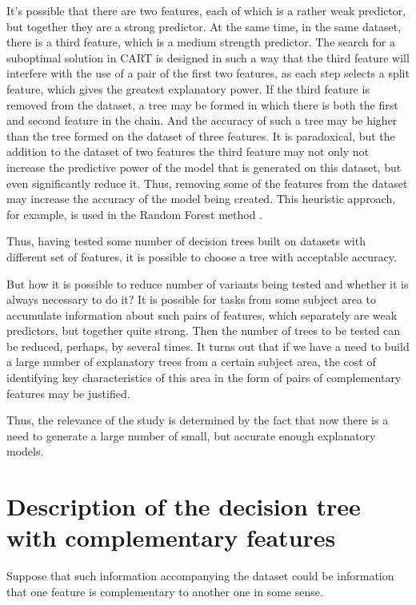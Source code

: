 \documentclass[conference]{IEEEtran}
\theoremstyle{definition}
\begin{document}
It's possible that there are two features, each of which is a rather weak predictor, but together they are a strong predictor. At the same time, in the same dataset, there is a third feature, which is a medium strength predictor. The search for a suboptimal solution in CART is designed in such a way that the third feature will interfere with the use of a pair of the first two features, as each step selects a split feature, which gives the greatest explanatory power. If the third feature is removed from the dataset, a tree may be formed in which there is both the first and second feature in the chain. And the accuracy of such a tree may be higher than the tree formed on the dataset of three features. It is paradoxical, but the addition to the dataset of two features the third feature may not only not increase the predictive power of the model that is generated on this dataset, but even significantly reduce it. Thus, removing some of the features from the dataset may increase the accuracy of the model being created. This heuristic approach, for example, is used in the Random Forest method \cite{RF}.


Thus, having tested some number of decision trees built on datasets with different set of features, it is possible to choose a tree with acceptable accuracy.


But how it is possible to reduce number of variants being tested and whether it is always necessary to do it? It is possible for tasks from some subject area to accumulate information about such pairs of features, which separately are weak predictors, but together quite strong. Then the number of trees to be tested can be reduced, perhaps, by several times. It turns out that if we have a need to build a large number of explanatory trees from a certain subject area, the cost of identifying key characteristics of this area in the form of pairs of complementary features may be justified.


Thus, the relevance of the study is determined by the fact that now there is a need to generate a large number of small, but accurate enough explanatory models.

\section{Description of the decision tree with complementary features}

Suppose that such information accompanying the dataset could be information that one feature is complementary to another one in some sense. 
\end{document}
